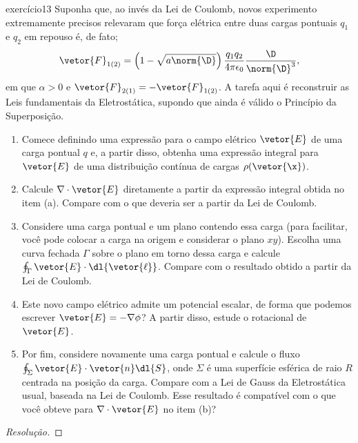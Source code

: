 \begin{exercício}{}{exercício13}
    Suponha que, ao invés da Lei de Coulomb, novos experimento extremamente precisos relevaram que força elétrica entre duas cargas pontuais \(q_1\) e \(q_2\) em repouso é, de fato;
    \begin{equation*}
        \vetor{F}_{1(2)} = \left(1 - \sqrt{a \norm{\D}}\right)\frac{q_1q_2}{4\pi \epsilon_0} \frac{\D}{\norm{\D}^3},
    \end{equation*}
    em que \(\alpha > 0\) e \(\vetor{F}_{2(1)} = -\vetor{F}_{1(2)}\). A tarefa aqui é reconstruir as Leis fundamentais da Eletrostática, supondo que ainda é válido o Princípio da Superposição.
    \begin{enumerate}[label=(\alph*)]
        \item Comece definindo uma expressão para o campo elétrico \(\vetor{E}\) de uma carga pontual \(q\) e, a partir disso, obtenha uma expressão integral para \(\vetor{E}\) de uma distribuição contínua de cargas \(\rho(\vetor{\x})\).
        \item Calcule \(\nabla \cdot \vetor{E}\) diretamente a partir da expressão integral obtida no item (a). Compare com o que deveria ser a partir da Lei de Coulomb.
        \item Considere uma carga pontual e um plano contendo essa carga (para facilitar, você pode colocar a carga na origem e considerar o plano \(xy\)). Escolha uma curva fechada \(\Gamma\) sobre o plano em torno dessa carga e calcule \(\oint_\Gamma \vetor{E}\cdot \dl{\vetor{\ell}}\). Compare com o resultado obtido a partir da Lei de Coulomb.
        \item Este novo campo elétrico admite um potencial escalar, de forma que podemos escrever \(\vetor{E} = - \nabla\phi\)? A partir disso, estude o rotacional de \(\vetor{E}\).
        \item Por fim, considere novamente uma carga pontual e calcule o fluxo \(\oint_\Sigma \vetor{E}\cdot \vetor{n}\dl{S}\), onde \(\Sigma\) é uma superfície esférica de raio \(R\) centrada na posição da carga. Compare com a Lei de Gauss da Eletrostática usual, baseada na Lei de Coulomb. Esse resultado é compatível com o que você obteve para \(\nabla\cdot \vetor{E}\) no item (b)?
    \end{enumerate}
\end{exercício}
\begin{proof}[Resolução]

\end{proof}
